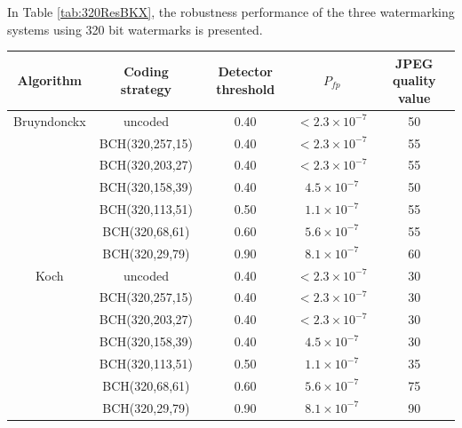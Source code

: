 \documentclass[12pt]{report}
\begin{document}
In Table \ref{tab:320ResBKX}, the robustness performance of the three watermarking systems using 320 bit watermarks
is presented. 
\begin{table}[!ht]
\tiny
        \begin{center}
                \begin{tabular}{|c|c|c|c|c|} \hline
                Algorithm       & Coding strategy       & Detector threshold    & $P_{fp}$              & JPEG quality value  \\ \hline\hline

                Bruyndonckx     & uncoded               & 0.40                  & $< 2.3\times 10^{-7}$ & 50                    \\ \cline{2-5}
                                & BCH(320,257,15)       & 0.40                  & $< 2.3\times 10^{-7}$ & 55                    \\ \cline{2-5}
                                & BCH(320,203,27)       & 0.40                  & $< 2.3\times 10^{-7}$ & 55                    \\ \cline{2-5}
                                & BCH(320,158,39)       & 0.40                  & $4.5\times 10^{-7}$   & 50                    \\ \cline{2-5}
                                & BCH(320,113,51)       & 0.50                  & $1.1\times 10^{-7}$   & 55                    \\ \cline{2-5}
                                & BCH(320,68,61)        & 0.60                  & $5.6\times 10^{-7}$   & 55                    \\ \cline{2-5}
                                & BCH(320,29,79)        & 0.90                  & $8.1\times 10^{-7}$   & 60                    \\ \hline\hline

                Koch    & uncoded               & 0.40                  & $< 2.3\times 10^{-7}$ 	& 30\\ \cline{2-5}
                        & BCH(320,257,15)       & 0.40                  & $< 2.3\times 10^{-7}$ 	& 30\\ \cline{2-5}
                        & BCH(320,203,27)       & 0.40                  & $< 2.3\times 10^{-7}$ 	& 30\\ \cline{2-5}
                        & BCH(320,158,39)       & 0.40                  & $4.5\times 10^{-7}$   	& 30\\ \cline{2-5}
                        & BCH(320,113,51)       & 0.50                  & $1.1\times 10^{-7}$   	& 35\\ \cline{2-5}
                        & BCH(320,68,61)        & 0.60                  & $5.6\times 10^{-7}$   	& 75\\ \cline{2-5}
                        & BCH(320,29,79)        & 0.90                  & $8.1\times 10^{-7}$   	& 90\\ \hline\hline


\end{tabular}
\end{center}
\end{table}
\end{document}

